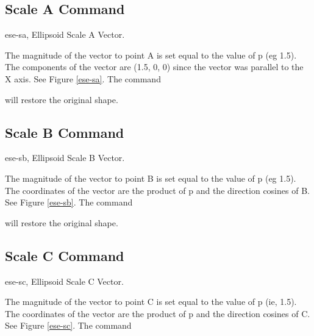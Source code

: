 \subsection{Scale A Command}
\mfig ese-sa, Ellipsoid Scale A Vector.


The magnitude of the vector to point A is set equal to the value of p
(eg 1.5).
The components of the vector are (1.5, 0, 0) since the vector was
parallel to the X axis.  See Figure \ref{ese-sa}.  The command


will restore the original shape.

\subsection{Scale B Command}
\mfig ese-sb, Ellipsoid Scale B Vector.


The magnitude of the vector to point B is set equal to the value of p
(eg 1.5).
The coordinates of the vector are the product of p and the
direction cosines of B.  See Figure \ref{ese-sb}.  The command


will restore the original shape.

\subsection{Scale C Command}
\mfig ese-sc, Ellipsoid Scale C Vector.


The magnitude of the vector to point C is set equal to the value of p
(ie, 1.5).
The coordinates of the vector are the product of p and the
direction cosines of C.  See Figure \ref{ese-sc}.  The command

